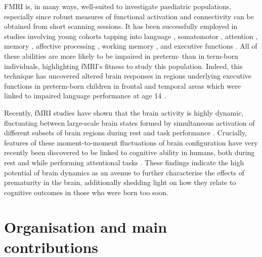 FMRI is, in many ways, well-suited to investigate paediatric populations, especially since robust measures of functional activation and connectivity can be obtained from short scanning sessions. It has been successfully employed in studies involving young cohorts tapping into language \citep{Centeno2014, Pigdon2020}, somatomotor \citep{Zwicker2011, Sgandurra2018}, attention \citep{Somandepalli2015, Jiang2019, Harrewijn2020}, memory \citep{Mankinen2015, DeBie2015}, affective processing \citep{Loveland2008, McRae2012}, working memory \citep{Siffredi2017, Yaple2018}, and executive functions \citep{Wang2013, Staphorsius2015}. All of these abilities are more likely to be impaired in preterm- than in term-born individuals, highlighting fMRI's fitness to study this population. Indeed, this technique has uncovered altered brain responses in regions underlying executive functions in preterm-born children in frontal \citep{Reveillon2013,Murner-Lavanchy2014} and temporal areas \citep{Kwon2014a, Wilke2014} which were linked to impaired language performance at age 14 \citep{Wilke2014}.
  
Recently, fMRI studies have shown that the brain activity is highly dynamic, fluctuating between large-scale brain states formed by simultaneous activation of different subsets of brain regions during rest \citep{Chang2010, Preti2017, Liu2018} and task performance \citep{Di2015, Cheng2018}. Crucially, features of these moment-to-moment fluctuations of brain configuration have very recently been discovered to be linked to cognitive ability in humans, both during rest \cite{Chen2019} and while performing attentional tasks \cite{Fong2019}. These findings indicate the high potential of brain dynamics as an avenue to further characterise the effects of prematurity in the brain, additionally shedding light on how they relate to cognitive outcomes in those who were born too soon. 
 


\section{Organisation and main contributions}


